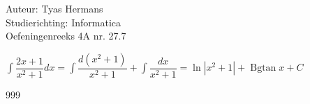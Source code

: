 \documentclass[a4paper]{article}
\newcommand{\dint}{\displaystyle\int}
\begin{document}
  
\noindent \large Auteur: Tyas Hermans \\
\noindent \large Studierichting: Informatica\\
\noindent \large Oefeningenreeks 4A nr. 27.7\\

\medskip

\normalsize

$\dint\dfrac{2x+1}{x^2+1}dx = \dint\dfrac{d(x^2+1)}{x^2+1} + \dint\dfrac{dx}{x^2+1} = \ln|x^2+1| + \operatorname{Bgtan}x + C$\\

\begin{thebibliography}{999}
\end{thebibliography}
\end{document}
